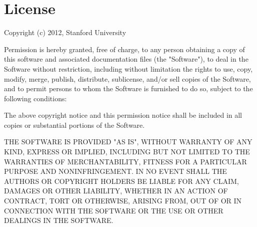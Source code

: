 \documentclass[twoside]{book}
\begin{document}
\appendix

\chapter{License}
Copyright (c) 2012, Stanford University

Permission is hereby granted, free of charge, to any person obtaining a copy of this software and associated documentation files (the "Software"), to deal in the Software without restriction, including without limitation the rights to use, copy, modify, merge, publish, distribute, sublicense, and/or sell copies of the Software, and to permit persons to whom the Software is furnished to do so, subject to the following conditions:

The above copyright notice and this permission notice shall be included in all copies or substantial portions of the Software.

THE SOFTWARE IS PROVIDED "AS IS", WITHOUT WARRANTY OF ANY KIND, EXPRESS OR IMPLIED, INCLUDING BUT NOT LIMITED TO THE WARRANTIES OF MERCHANTABILITY, FITNESS FOR A PARTICULAR PURPOSE AND NONINFRINGEMENT. IN NO EVENT SHALL THE AUTHORS OR COPYRIGHT HOLDERS BE LIABLE FOR ANY CLAIM, DAMAGES OR OTHER LIABILITY, WHETHER IN AN ACTION OF CONTRACT, TORT OR OTHERWISE, ARISING FROM, OUT OF OR IN CONNECTION WITH THE SOFTWARE OR THE USE OR OTHER DEALINGS IN THE 
SOFTWARE.

\end{document}
